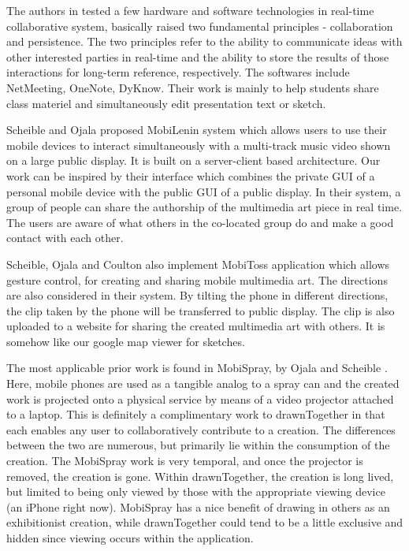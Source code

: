 \documentclass{chi2009}
\begin{document}
 The authors in \cite{ink:lindell} tested a few hardware and software
technologies in real-time collaborative system, basically raised two
fundamental principles - collaboration and persistence. The two principles
refer to the ability to communicate ideas with other interested parties in
real-time and the ability to store the results of those interactions for
long-term reference, respectively. The softwares include NetMeeting, OneNote,
DyKnow. Their work is mainly to help students share class materiel and
simultaneously edit presentation text or  sketch.

Scheible and Ojala \cite{mobilenin:scheible} proposed MobiLenin system which allows users to use their mobile devices to interact simultaneously with a multi-track music video shown on a large public display. It is built on a server-client based architecture. Our work can be inspired by their interface which combines the private GUI of a personal mobile device with the public GUI of a public display. In their system, a group of people can share the authorship of the multimedia art piece in real time. The users are aware of what others in the co-located group do and make a good contact with each other.

Scheible, Ojala and Coulton \cite{mobitoss:scheible} also implement MobiToss application which allows gesture control, for creating and sharing mobile multimedia art. The directions are also considered in their system. By tilting the phone in different directions, the clip taken by the phone will be transferred to public display. The clip is also uploaded to a website for sharing the created multimedia art with others. It is somehow like our google map viewer for sketches.

The most applicable prior work is found in MobiSpray, by Ojala and Scheible
\cite{ojala2009project}.  Here, mobile phones are used as a tangible analog to
a spray can and the created work is projected onto a physical service by means
of a video projector attached to a laptop.  This is definitely a complimentary
work to drawnTogether in that each enables any user to collaboratively
contribute to a creation.  The differences between the two are numerous, but
primarily lie within the consumption of the creation.  The MobiSpray work is
very temporal, and once the projector is removed, the creation is gone.  Within
drawnTogether, the creation is long lived, but limited to being only viewed by
those with the appropriate viewing device (an iPhone right now).  MobiSpray has
a nice benefit of drawing in others as an exhibitionist creation, while
drawnTogether could tend to be a little exclusive and hidden since viewing
occurs within the application.
\end{document}
